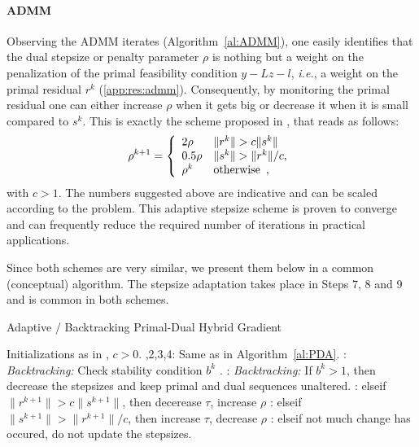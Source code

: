 \documentclass[openany]{now}
\newcommand{\ie}{{\it i.e.}}
\begin{document}
\paragraph*{ADMM} Observing the ADMM iterates (Algorithm~\ref{al:ADMM}), one easily identifies that the dual stepsize or penalty parameter $\rho$ is nothing but a weight on the penalization of the primal feasibility condition $y-Lz-l$, \ie, a weight on the primal residual $r^k$ (\ref{app:res:admm}). Consequently, by monitoring the primal residual one can either increase $\rho$ when it gets big or decrease it when it is small compared to $s^k$. This is exactly the scheme proposed in \cite{He:adapt_admm}, that reads as follows:
\begin{equation} {\label{eq:adapt_rho}}
\rho^{k+1} = \left\{\begin{array}{ll} 2\rho & \|r^{k}\|>c \|s^{k}\| \\
                                      0.5\rho & \|s^{k}\|> \|r^{k}\|/c, \\
                                      \rho^k & \mbox{otherwise}\enspace,
                    \end{array} \right.
\end{equation}
with $c>1$. The numbers suggested above are indicative and can be scaled according to the problem. This adaptive stepsize scheme is proven to converge and can frequently reduce the required number of iterations in practical applications.

\iffalse
Since both schemes are very similar, we present them below in a common (conceptual) algorithm. The stepsize adaptation takes place in Steps 7, 8 and 9 and is common in both schemes. 
\begin{algorithm}[H]
\caption{Adaptive / Backtracking Primal-Dual Hybrid Gradient}
\label{al:ad_back_PDHG}
\begin{algorithmic} 
\REQUIRE Initializations as in \cite{goldstein2013adaptive}, $c>0$.
\LOOP
  ,2,3,4: Same as in Algorithm~\ref{al:PDA}.
  : \emph{Backtracking:} Check stability condition $b^k$ \cite[(26)]{goldstein2013adaptive}.
  : \emph{Backtracking:} If $b^k>1$, then decrease the stepsizes and keep primal and dual sequences unaltered.
  : \quad \quad elseif $\|r^{k+1}\|>c \|s^{k+1}\|$, then decerease $\tau$, increase $\rho$
  : \quad \quad elseif $\|s^{k+1}\|> \|r^{k+1}\|/c$, then increase $\tau$, decrease $\rho$
  : \quad \quad elseif not much change has occured, do not update the stepsizes.
\ENDLOOP
\end{algorithmic}
\end{algorithm}\begin{footnotesize}
\end{footnotesize}
\end{document}
